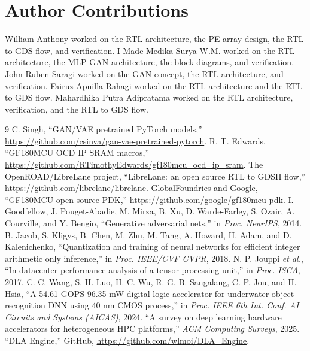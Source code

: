 \documentclass[conference]{IEEEtran}
\begin{document}
\section*{Author Contributions}
William Anthony worked on the RTL architecture, the PE array design, the RTL to GDS flow, and verification. I Made Medika Surya W.M. worked on the RTL architecture, the MLP GAN architecture, the block diagrams, and verification. John Ruben Saragi worked on the GAN concept, the RTL architecture, and verification. Fairuz Apuilla Rahagi worked on the RTL architecture and the RTL to GDS flow. Mahardhika Putra Adipratama worked on the RTL architecture, verification, and the RTL to GDS flow.

\begin{thebibliography}{9}
 C. Singh, ``GAN/VAE pretrained PyTorch models,'' \url{https://github.com/csinva/gan-vae-pretrained-pytorch}.
 R. T. Edwards, ``GF180MCU OCD IP SRAM macros,'' \url{https://github.com/RTimothyEdwards/gf180mcu_ocd_ip_sram}.
 The OpenROAD/LibreLane project, ``LibreLane: an open source RTL to GDSII flow,'' \url{https://github.com/librelane/librelane}.
 GlobalFoundries and Google, ``GF180MCU open source PDK,'' \url{https://github.com/google/gf180mcu-pdk}.
 I. Goodfellow, J. Pouget-Abadie, M. Mirza, B. Xu, D. Warde-Farley, S. Ozair, A. Courville, and Y. Bengio, ``Generative adversarial nets,'' in \emph{Proc. NeurIPS}, 2014.
 B. Jacob, S. Kligys, B. Chen, M. Zhu, M. Tang, A. Howard, H. Adam, and D. Kalenichenko, ``Quantization and training of neural networks for efficient integer arithmetic only inference,'' in \emph{Proc. IEEE/CVF CVPR}, 2018.
 N. P. Jouppi \emph{et al.}, ``In datacenter performance analysis of a tensor processing unit,'' in \emph{Proc. ISCA}, 2017.
 C. C. Wang, S. H. Luo, H. C. Wu, R. G. B. Sangalang, C. P. Jou, and H. Hsia, ``A 54.61 GOPS 96.35 mW digital logic accelerator for underwater object recognition DNN using 40 nm CMOS process,'' in \emph{Proc. IEEE 6th Int. Conf. AI Circuits and Systems (AICAS)}, 2024.
 ``A survey on deep learning hardware accelerators for heterogeneous HPC platforms,'' \emph{ACM Computing Surveys}, 2025.
 ``DLA Engine,'' GitHub, \url{https://github.com/wlmoi/DLA_Engine}.
\end{thebibliography}
\end{document}
